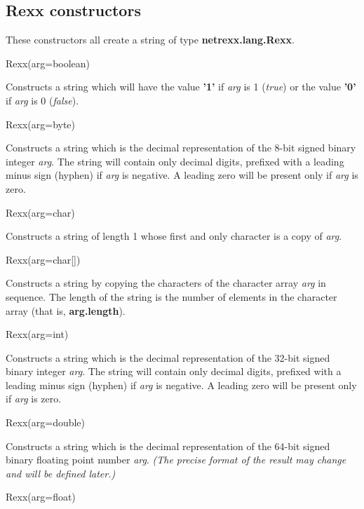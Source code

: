 \subsection{Rexx constructors}\label{"id"}
 These constructors all create a string of type \textbf{netrexx.lang.Rexx}.
\begin{description}
\item{Rexx(arg=boolean)}

Constructs a string which will have
the value \textbf{'1'} if \emph{arg} is 1 (\emph{true})
or the value \textbf{'0'} if \emph{arg} is 0 (\emph{false}).
\item{Rexx(arg=byte)}

Constructs a string which is the decimal representation of
the 8-bit signed binary integer \emph{arg}.
The string will contain only decimal digits, prefixed with a
leading minus sign (hyphen) if \emph{arg} is negative.
A leading zero will be present only if \emph{arg} is zero.
\item{Rexx(arg=char)}

Constructs a string of length 1 whose first and only character is a
copy of \emph{arg}.
\item{Rexx(arg=char[])}

Constructs a string by copying the characters of the character array
\emph{arg} in sequence.
The length of the string is the number of elements in the character
array (that is, \textbf{arg.length}).
\item{Rexx(arg=int)}

Constructs a string which is the decimal representation of
the 32-bit signed binary integer \emph{arg}.
The string will contain only decimal digits, prefixed with a
leading minus sign (hyphen) if \emph{arg} is negative.
A leading zero will be present only if \emph{arg} is zero.
\item{Rexx(arg=double)}

Constructs a string which is the decimal representation of
the 64-bit signed binary floating point number \emph{arg}.
 \emph{(The precise format of the result may change and
will be defined later.)}
\item{Rexx(arg=float)}


\end{description}
